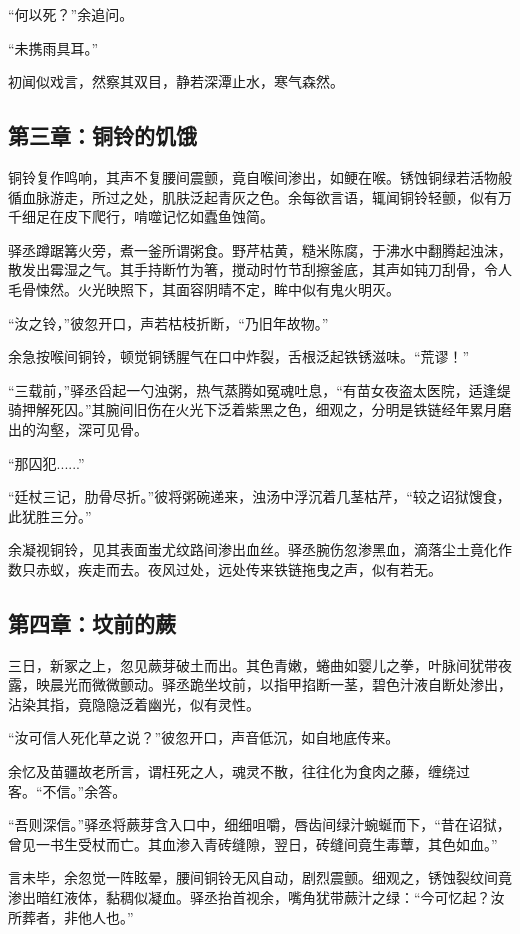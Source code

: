 \documentclass{article}
\begin{document}
	“何以死？”余追问。
	
	“未携雨具耳。”
	
	初闻似戏言，然察其双目，静若深潭止水，寒气森然。
	
	\subsection{第三章：铜铃的饥饿}
	
	铜铃复作鸣响，其声不复腰间震颤，竟自喉间渗出，如鲠在喉。锈蚀铜绿若活物般循血脉游走，所过之处，肌肤泛起青灰之色。余每欲言语，辄闻铜铃轻颤，似有万千细足在皮下爬行，啃噬记忆如蠹鱼蚀简。
	
	驿丞蹲踞篝火旁，煮一釜所谓粥食。野芹枯黄，糙米陈腐，于沸水中翻腾起浊沫，散发出霉湿之气。其手持断竹为箸，搅动时竹节刮擦釜底，其声如钝刀刮骨，令人毛骨悚然。火光映照下，其面容阴晴不定，眸中似有鬼火明灭。
	
	“汝之铃，”彼忽开口，声若枯枝折断，“乃旧年故物。”
	
	余急按喉间铜铃，顿觉铜锈腥气在口中炸裂，舌根泛起铁锈滋味。“荒谬！”
	
	“三载前，”驿丞舀起一勺浊粥，热气蒸腾如冤魂吐息，“有苗女夜盗太医院，适逢缇骑押解死囚。”其腕间旧伤在火光下泛着紫黑之色，细观之，分明是铁链经年累月磨出的沟壑，深可见骨。
	
	“那囚犯......”
	
	“廷杖三记，肋骨尽折。”彼将粥碗递来，浊汤中浮沉着几茎枯芹，“较之诏狱馊食，此犹胜三分。”
	
	余凝视铜铃，见其表面蚩尤纹路间渗出血丝。驿丞腕伤忽渗黑血，滴落尘土竟化作数只赤蚁，疾走而去。夜风过处，远处传来铁链拖曳之声，似有若无。
	
	\subsection{第四章：坟前的蕨}
	
	三日，新冢之上，忽见蕨芽破土而出。其色青嫩，蜷曲如婴儿之拳，叶脉间犹带夜露，映晨光而微微颤动。驿丞跪坐坟前，以指甲掐断一茎，碧色汁液自断处渗出，沾染其指，竟隐隐泛着幽光，似有灵性。
	
	“汝可信人死化草之说？”彼忽开口，声音低沉，如自地底传来。
	
	余忆及苗疆故老所言，谓枉死之人，魂灵不散，往往化为食肉之藤，缠绕过客。“不信。”余答。
	
	“吾则深信。”驿丞将蕨芽含入口中，细细咀嚼，唇齿间绿汁蜿蜒而下，“昔在诏狱，曾见一书生受杖而亡。其血渗入青砖缝隙，翌日，砖缝间竟生毒蕈，其色如血。”
	
	言未毕，余忽觉一阵眩晕，腰间铜铃无风自动，剧烈震颤。细观之，锈蚀裂纹间竟渗出暗红液体，黏稠似凝血。驿丞抬首视余，嘴角犹带蕨汁之绿：“今可忆起？汝所葬者，非他人也。”
	
\end{document}
